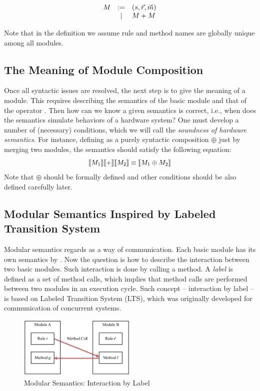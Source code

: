 $$\begin{array}{rcl}
  M{} & := & (s, \vec{r}, \vec{m}) \\
  & | & M{} +{} M{} \\
\end{array}$$

Note that in the definition we assume rule and method names are
globally unique among all modules.

\subsection{The Meaning of Module Composition}
Once all syntactic issues are resolved, the next step is to give the
meaning of a module. This requires describing the semantics of the
basic module  and that of the \ModP{}
operator \Sem{\ModP{}}. Then how can we know a given semantics is
correct, i.e., when does the semantics simulate behaviors of a
hardware system?  One must develop a number of (necessary) conditions,
which we will call the \emph{soundness of hardware semantics}. For
instance, defining \ModP{} as a purely syntactic composition $\oplus$
just by merging two modules, the semantics should satisfy the
following equation:
$$\llbracket M_1 \rrbracket \llbracket +{} \rrbracket \llbracket M_2 \rrbracket \equiv \llbracket M_1 \oplus M_2 \rrbracket$$ Note
that $\oplus$ should be formally defined and other conditions should
be also defined carefully later.

\subsection{Modular Semantics Inspired by Labeled Transition System}
\label{sec:mod}

Modular semantics regards \Sem{\ModP{}} as a way of
communication. Each basic module has its own semantics by
. Now the question is how to describe
the interaction between two basic modules. Such interaction is done by
calling a method. A \emph{label} is defined as a set of method calls,
which implies that method calls are performed between two modules in
an execution cycle. Such concept -- interaction by label -- is based
on Labeled Transition System (LTS), which was originally developed for
communication of concurrent systems.
\begin{figure}[h]
  \centering
  \includegraphics[width=0.5\textwidth]{figures/modular-sem.pdf}
  \caption{Modular Semantics: Interaction by Label}
  \label{fig:mod}
\end{figure}

